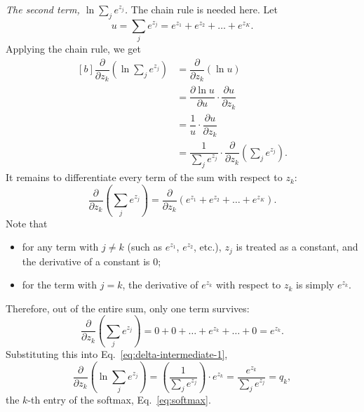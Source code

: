 \documentclass[12pt]{article}
\numberwithin{equation}{section} %
\begin{document}
\emph{The second term, $\ln\sum_j e^{z_j}$.} The chain rule is needed here. Let
\begin{equation}\label{eq:u-sum-def}
    u = {\sum_j e^{z_j}} = e^{z_{1}}+e^{z_{2}}+\dots +e^{z_{K}}.
\end{equation}
Applying the chain rule, we get
\begin{equation}\label{eq:delta-intermediate-1}
\begin{aligned}[b]
    \dfrac{\partial}{\partial z_{k}}\left(\ln \sum_j e^{z_j}\right) &=
        \dfrac{\partial}{\partial z_{k}} \left(\ln u \right) \\[1pt]
        &=
        \dfrac{\partial \ln u}{\partial u} \cdot \dfrac{\partial u}{\partial z_{k}} \\[1pt]
        &=
        \dfrac{1}{u} \cdot \dfrac{\partial u}{\partial z_{k}} \\[1pt]
        &=
        \dfrac{1}{\sum _{j}e^{z_{j}}} \cdot \dfrac{\partial}{\partial z_{k}}\left(\sum_j e^{z_j}\right).
\end{aligned}
\end{equation}
It remains to differentiate every term of the sum with respect to $z_k$:
\begin{equation}\label{eq:delta-intermediate-2}
    \dfrac{\partial}{\partial z_{k}} \left(\sum_{j}e^{z_{j}}\right) =
        \dfrac{\partial}{\partial z_{k}}\left(e^{z_{1}}+e^{z_{2}}+\dots +e^{z_{K}}\right).
\end{equation}
Note that
\begin{itemize}
  \item for any term with $j\ne k$ (such as $e^{z_1}$, $e^{z_2}$, etc.),
        $z_{j}$ is treated as a constant, and the derivative of a constant is 0;
  \item for the term with $j=k$, the derivative of $e^{z_{k}}$ with respect to
        $z_{k}$ is simply $e^{z_{k}}$.
\end{itemize}
Therefore, out of the entire sum, only one term survives:
\begin{equation}\label{eq:delta-sum-logit-zk}
    \dfrac{\partial}{\partial z_{k}} \left(\sum_{j}e^{z_{j}}\right) =
        0+0+\dots +e^{z_{k}}+\dots +0=e^{z_{k}} .
\end{equation}
Substituting this into Eq.~\eqref{eq:delta-intermediate-1},
\begin{equation}\label{eq:delta-wrt-logit}
    \dfrac{\partial}{\partial z_{k}}\left(\ln \sum_{j}e^{z_{j}}\right)
        = \left(\frac{1}{\sum_{j}e^{z_{j}}}\right)\cdot e^{z_{k}}
        = \dfrac{e^{z_{k}}}{\sum_{j}e^{z_{j}}} = q_k ,
\end{equation}
the $k$-th entry of the softmax, Eq.~\eqref{eq:softmax}.
\end{document}
